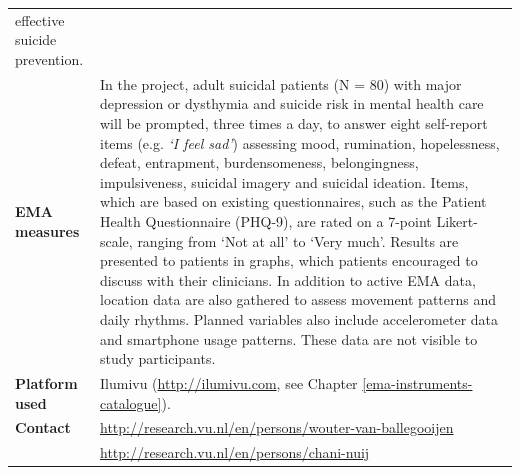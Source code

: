 \documentclass[]{book}
\begin{document}
\begin{longtable}[]{@{}ll@{}}
\begin{minipage}[t]{0.69\columnwidth}
effective suicide prevention.\strut
\end{minipage}\tabularnewline
\begin{minipage}[t]{0.25\columnwidth}\raggedright\strut
\textbf{EMA measures}\strut
\end{minipage} & \begin{minipage}[t]{0.69\columnwidth}\raggedright\strut
In the project, adult suicidal patients (N = 80) with major depression
or dysthymia and suicide risk in mental health care will be prompted,
three times a day, to answer eight self-report items (e.g. \emph{`I feel
sad'}) assessing mood, rumination, hopelessness, defeat, entrapment,
burdensomeness, belongingness, impulsiveness, suicidal imagery and
suicidal ideation. Items, which are based on existing questionnaires,
such as the Patient Health Questionnaire (PHQ-9), are rated on a 7-point
Likert-scale, ranging from `Not at all' to `Very much'. Results are
presented to patients in graphs, which patients encouraged to discuss
with their clinicians. In addition to active EMA data, location data are
also gathered to assess movement patterns and daily rhythms. Planned
variables also include accelerometer data and smartphone usage patterns.
These data are not visible to study participants.\strut
\end{minipage}\tabularnewline
\begin{minipage}[t]{0.25\columnwidth}\raggedright\strut
\textbf{Platform used}\strut
\end{minipage} & \begin{minipage}[t]{0.69\columnwidth}\raggedright\strut
Ilumivu (\url{http://ilumivu.com}, see Chapter
\ref{ema-instruments-catalogue}).\strut
\end{minipage}\tabularnewline
\begin{minipage}[t]{0.25\columnwidth}\raggedright\strut
\textbf{Contact}\strut
\end{minipage} & \begin{minipage}[t]{0.69\columnwidth}\raggedright\strut
\url{http://research.vu.nl/en/persons/wouter-van-ballegooijen}\strut
\end{minipage}\tabularnewline
\begin{minipage}[t]{0.25\columnwidth}\raggedright\strut
\strut
\end{minipage} & \begin{minipage}[t]{0.69\columnwidth}\raggedright\strut
\url{http://research.vu.nl/en/persons/chani-nuij}\strut
\end{minipage}\tabularnewline
\bottomrule
\end{longtable}
\end{document}
